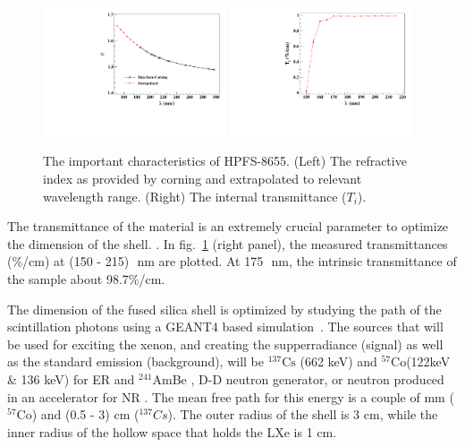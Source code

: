 \begin{figure}[h]
   \centering
   \includegraphics[width=0.48\textwidth]{RI-calibration.pdf}
    \includegraphics[width=0.48\textwidth]{IntTransmittance.pdf}
   \caption{The important characteristics of HPFS-8655. (Left) The refractive index as provided by corning and 
   extrapolated to relevant wavelength range. (Right) The internal transmittance ($T_{i}$).} 
   \label{fig:hpfsRIcalibration}
\end{figure}

The transmittance of the material is an extremely crucial parameter to optimize the 
dimension of the shell. . 
In fig.~\ref{fig:hpfsRIcalibration} (right panel), the measured 
transmittances (\%/cm) at (150 - 215)~\,nm are plotted. At 175~\,nm, the intrinsic transmittance 
of the sample about 98.7\%/cm.  


The dimension of the fused silica shell is optimized by studying the path of the 
scintillation photons using a GEANT4 based simulation~\cite{Agostinelli:2002hh}. 
The sources that will be used for exciting the xenon, and creating the supperradiance 
(signal) as well as the standard emission (background), will be $^{137} \mathrm{Cs}$ 
(662 keV) and $^{57} \mathrm{Co}$(122keV \& 136 keV) for ER and $^{241}$AmBe , 
D-D neutron generator, or neutron produced in an accelerator for NR . The mean 
free path for this energy is a couple of mm ($^{57} \mathrm{Co}$) and (0.5 - 3) 
cm ($^{137} Cs$).  The outer radius of the shell is 3 cm, while the inner radius of the 
hollow space that holds the LXe is 1 cm. 


